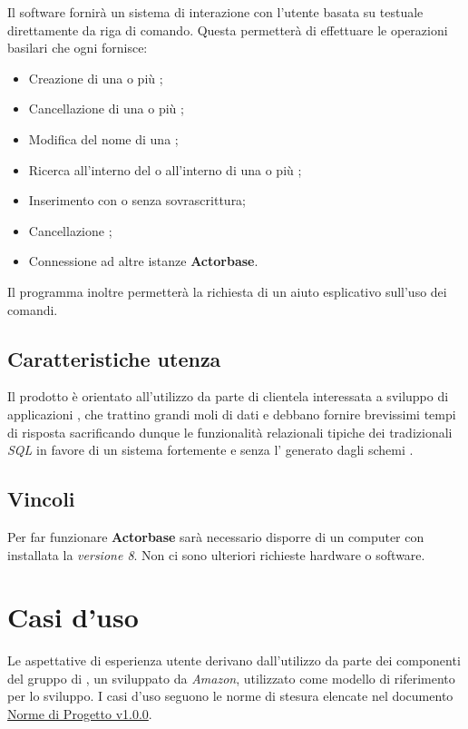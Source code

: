\documentclass{scalatekids-article}
\begin{document}
Il software fornirà un sistema di interazione con l'utente basata su 
testuale direttamente da riga di comando. Questa permetterà di effettuare le operazioni
basilari che ogni  fornisce:
\begin{itemize}
\item Creazione di una o più ;
\item Cancellazione di una o più ;
\item Modifica del nome di una ;
\item Ricerca all'interno del  o all'interno di una o più ;
\item Inserimento  con o senza sovrascrittura;
\item Cancellazione ;
\item Connessione ad altre istanze \textbf{Actorbase}.
\end{itemize}
Il programma inoltre permetterà la richiesta di un aiuto esplicativo sull'uso
dei comandi.

\subsection{Caratteristiche utenza}

Il prodotto è orientato all'utilizzo da parte di clientela interessata a
sviluppo di applicazioni , che trattino grandi moli di dati e
debbano fornire brevissimi tempi di risposta sacrificando dunque le funzionalità
relazionali tipiche dei tradizionali  \textit{SQL} in favore di
un sistema fortemente  e senza l' generato
dagli schemi .

\subsection{Vincoli}

Per far funzionare \textbf{Actorbase} sarà necessario disporre di un computer con
installata la \textit{ versione 8}. Non ci sono ulteriori richieste hardware o software.

\section{Casi d'uso}

Le aspettative di esperienza utente derivano dall'utilizzo da parte dei
componenti del gruppo di , un  
sviluppato da \textit{Amazon}, utilizzato come modello di riferimento per lo sviluppo. I casi d'uso seguono le norme di stesura elencate nel documento \href{run:../Interni/NormeDiProgetto\_v1.0.0.pdf}{Norme di Progetto v1.0.0}.
\end{document}
